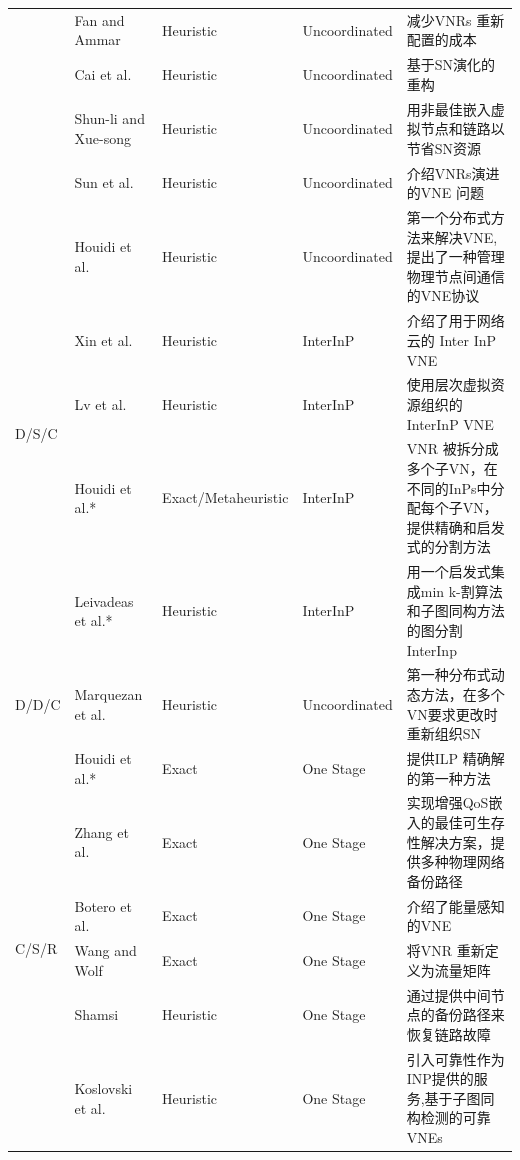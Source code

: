 \begin{longtable}[h]{@{}lm{}m{}m{}m{}}
 & Fan and Ammar  \cite{fan2006dynamic}  & Heuristic & Uncoordinated & 减少VNRs 重新配置的成本\\
 & Cai et al.  \cite{cai2010virtual}  & Heuristic & Uncoordinated & 基于SN演化的重构\\
 & Shun-li and Xue-song  \cite{zhang2011novel}  & Heuristic & Uncoordinated & 用非最佳嵌入虚拟节点和链路以节省SN资源\\
 & Sun et al.  \cite{sun2013cost}  & Heuristic & Uncoordinated & 介绍VNRs演进的VNE 问题
\\
\hline
\multirow{5}{*}{D/S/C} & Houidi et al.  \cite{houidi2008distributed,houidi2008distributed}  & Heuristic & Uncoordinated & 第一个分布式方法来解决VNE,提出了一种管理物理节点间通信的VNE协议\\
 & Xin et al.  \cite{xin2011embedding}  & Heuristic & InterInP & 介绍了用于网络云的 Inter InP VNE\\
 & Lv et al.  \cite{lv2010virtual}  & Heuristic & InterInP & 使用层次虚拟资源组织的InterInP VNE\\
 & Houidi et al.*  \cite{houidi2011virtual}  & Exact/Metaheuristic & InterInP & VNR 被拆分成多个子VN，在不同的InPs中分配每个子VN，提供精确和启发式的分割方法\\
 & Leivadeas et al.*  \cite{leivadeas2013efficient}  & Heuristic & InterInP & 用一个启发式集成min k-割算法和子图同构方法的图分割InterInp
\\
\hline
\multirow{1}{*}{D/D/C} & Marquezan et al.  \cite{marquezan2010distributed}  & Heuristic  & Uncoordinated & 第一种分布式动态方法，在多个VN要求更改时重新组织SN\\
\hline
\multirow{31}{*}{C/S/R} & Houidi et al.*  \cite{houidi2011virtual}  & Exact & One Stage & 提供ILP 精确解的第一种方法\\
 & Zhang et al.  \cite{zhang2011overlay}  & Exact & One Stage & 实现增强QoS嵌入的最佳可生存性解决方案，提供多种物理网络备份路径\\
 & Botero et al.  \cite{botero2012energy}  & Exact & One Stage & 介绍了能量感知的VNE\\
 & Wang and Wolf  \cite{wang2012virtual}  & Exact & One Stage & 将VNR 重新定义为流量矩阵 \\
 & Shamsi\cite{shamsi2007qosmap,shamsi2008efficient,shamsi2009qosmap}  & Heuristic & One Stage & 通过提供中间节点的备份路径来恢复链路故障\\
 & Koslovski et al.  \cite{koslovski2010reliability}  & Heuristic & One Stage & 引入可靠性作为INP提供的服务,基于子图同构检测的可靠VNEs\\

\end{longtable}
